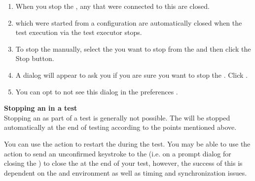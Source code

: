 
\begin{enumerate}
\item When you stop the \gdagent{}, any \gdauts{} that were connected to this \gdagent{} are closed.
\item \gdauts{} which were started from a configuration are automatically closed when the test execution via the test executor stops.
\item To stop the \gdaut{} manually, select the \gdaut{} you want to stop from the \gdrunautview{} and then click the {Stop \gdaut{}} button. 
\item A dialog will appear to ask you if you are sure you want to stop the \gdaut{}. Click . 
\item You can opt to not see this dialog in the  preferences . 
\end{enumerate}

\textbf{Stopping an \gdaut{} in a test}\\
Stopping an \gdaut{} as part of a test is generally not possible. The \gdaut{} will be stopped automatically at the end of testing according to the points mentioned above.

You can use the  action to restart the \gdaut{} during the test. You may be able to use the action  to send an unconfirmed keystroke to the \gdaut{} (i.e.  on a prompt dialog for closing the \gdaut{}) to close the \gdaut{} at the end of your test, however, the success of this is dependent on the \gdaut{} and environment as well as timing and synchronization issues. 
